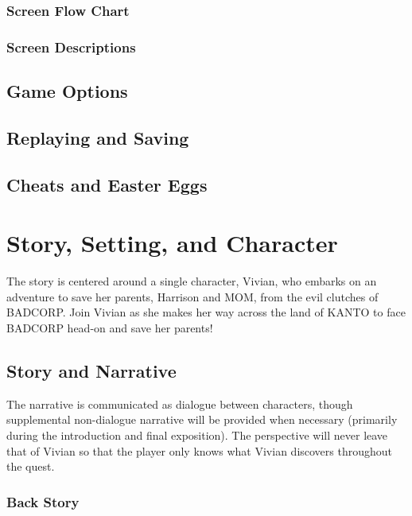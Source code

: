 \documentclass[12pt,titlepage]{article}
\newcommand\protagonist{Vivian\xspace}
\newcommand\dad{Harrison\xspace}
\newcommand\mom{MOM\xspace}
\newcommand\evilcorp{BADCORP\xspace}
\newcommand\world{KANTO\xspace}
\begin{document}
\subsubsection{Screen Flow Chart}

\subsubsection{Screen Descriptions}
%

\subsection{Game Options}

\subsection{Replaying and Saving}

\subsection{Cheats and Easter Eggs}

\newpage
\section{Story, Setting, and Character}

The story is centered around a single character, \protagonist, who embarks on an
adventure to save her parents, \dad and \mom, from the evil clutches of
\evilcorp. Join \protagonist as she makes her way across the land of \world to
face \evilcorp head-on and save her parents!

\subsection{Story and Narrative}

The narrative is communicated as dialogue between characters, though
supplemental non-dialogue narrative will be provided when necessary (primarily
during the introduction and final exposition). The perspective will never leave
that of \protagonist so that the player only knows what \protagonist discovers
throughout the quest.

\subsubsection{Back Story}
\end{document}
